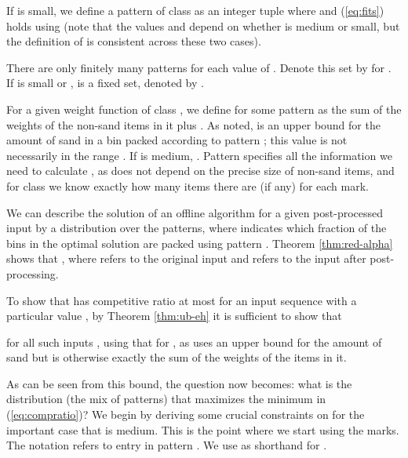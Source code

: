 If  is small, we define a pattern of class  as an integer tuple
 where  and (\ref{eq:fits}) holds
using 
(note that the values  and  depend on whether  is medium or small,
but the definition of  is consistent across these two cases).

There are only finitely many patterns for each value of . 
Denote this set by  for .
If  is small or ,  is a fixed set, denoted by .

For a given weight function  of class , 
we define  for some pattern  as the sum of the weights of the non-sand items in it plus
. As noted, 
is an upper bound for the amount of sand in a bin packed according to pattern ; this 
value is not necessarily in the range . If  is medium, .
Pattern  specifies all the information we need to
calculate , as  does not depend on the precise size of non-sand items, and for class 
we know exactly how many items there are (if any) for each mark.

\iffalse 
following terms.
\begin{itemize}
	\item
	For , we have a term  (the mark is irrelevant here:
	either  is medium and then  is the unique type such that ,
	or  is not medium and then items of class  have no mark).
	\item 
	For , if , we have a term , else we have a term
	 (these items are not marked in this case)
	\item 
	For , there is a term  (these items are not marked; the first argument is an upper bound for the volume left for sand. This 
\end{itemize}
\fi 

We can describe the solution of an offline algorithm for a given post-processed input  by a distribution  over
the patterns, where  indicates which fraction of the bins 
in the optimal solution are packed using pattern . 
Theorem \ref{thm:red-alpha} shows that , where  refers to the original input and  refers to the input after post-processing.

To show that \EHarm{} has competitive ratio at most  for an input sequence
 with
{a particular value } , by Theorem \ref{thm:ub-eh} it is sufficient to show that

for all such inputs , using that
 for ,
as  uses an upper bound for the amount of sand but is otherwise exactly the sum of the weights
of the items in it.


As can be seen from this bound, the question now becomes: what is the distribution  (the mix of patterns) that maximizes the minimum in (\ref{eq:compratio})? We begin by deriving some crucial constraints on  for the important case that  is medium.
This is the point where we start using the marks.
The notation  refers to entry  in pattern .
We use  as shorthand for .

